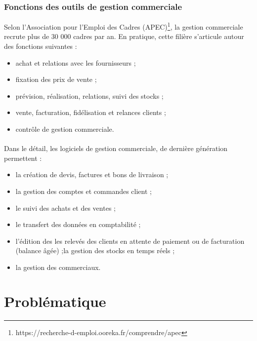 \subsubsection{Fonctions des outils de gestion commerciale}
Selon l’Association pour l'Emploi des Cadres (APEC)\footnote{https://recherche-d-emploi.ooreka.fr/comprendre/apec}, la gestion commerciale recrute plus de 30 000 cadres par an. En pratique, cette filière s’articule autour des fonctions suivantes :
\begin{itemize}
    \item achat et relations avec les fournisseurs ;
    \item fixation des prix de vente ;
    \item prévision, réalisation, relations, suivi des stocks ;
    \item vente, facturation, fidélisation et relances clients ;
    \item contrôle de gestion commerciale.
\end{itemize}
\paragraph{}
Dans le détail, les logiciels de gestion commerciale, de dernière génération permettent :
\begin{itemize}
    \item la création de devis, factures et bons de livraison ;
    \item la gestion des comptes et commandes client ;
    \item le suivi des achats et des ventes ;
    \item le transfert des données en comptabilité ;
    \item l’édition des les relevés des clients en attente de paiement ou de facturation (balance âgée) ;la gestion des stocks en temps réels ;
    \item la gestion des commerciaux.
\end{itemize}




 



\section{Problématique}
